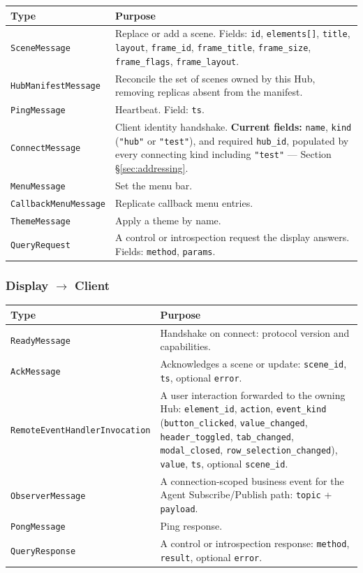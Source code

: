 \documentclass[a4paper,10pt]{article}
\newcommand{\msg}[1]{\texttt{#1}}
\newcommand{\field}[1]{\texttt{#1}}
\begin{document}
\begin{center}
\begin{tabular}{lp{9cm}}
\toprule
\textbf{Type} & \textbf{Purpose} \\
\midrule
\msg{SceneMessage}  & Replace or add a scene.  Fields: \field{id},
  \field{elements[]}, \field{title}, \field{layout}, \field{frame\_id},
  \field{frame\_title}, \field{frame\_size}, \field{frame\_flags},
  \field{frame\_layout}. \\
\msg{HubManifestMessage} & Reconcile the set of scenes owned by this Hub,
  removing replicas absent from the manifest. \\
\msg{PingMessage}   & Heartbeat.  Field: \field{ts}. \\
\msg{ConnectMessage} & Client identity handshake.  \textbf{Current fields:}
  \field{name}, \field{kind} (\texttt{"hub"} or \texttt{"test"}), and required
  \field{hub\_id}, populated by every connecting kind including
  \texttt{"test"} --- Section \S\ref{sec:addressing}. \\
\msg{MenuMessage}   & Set the menu bar. \\
\msg{CallbackMenuMessage} & Replicate callback menu entries. \\
\msg{ThemeMessage}  & Apply a theme by name. \\
\msg{QueryRequest}  & A control or introspection request the display
  answers.  Fields: \field{method}, \field{params}. \\
\bottomrule
\end{tabular}
\end{center}

\subsubsection{Display $\to$ Client}

\begin{center}
\begin{tabular}{lp{9cm}}
\toprule
\textbf{Type} & \textbf{Purpose} \\
\midrule
\msg{ReadyMessage}       & Handshake on connect: protocol version and
  capabilities. \\
\msg{AckMessage}         & Acknowledges a scene or update: \field{scene\_id},
  \field{ts}, optional \field{error}. \\
\msg{RemoteEventHandlerInvocation} & A user interaction forwarded to the
  owning Hub: \field{element\_id}, \field{action}, \field{event\_kind}
  (\texttt{button\_clicked}, \texttt{value\_changed},
  \texttt{header\_toggled}, \texttt{tab\_changed},
  \texttt{modal\_closed}, \texttt{row\_selection\_changed}), \field{value},
  \field{ts}, optional \field{scene\_id}. \\
\msg{ObserverMessage}    & A connection-scoped business event for the Agent
  Subscribe/Publish path: \field{topic} + \field{payload}. \\
\msg{PongMessage}        & Ping response. \\
\msg{QueryResponse}      & A control or introspection response:
  \field{method}, \field{result}, optional \field{error}. \\
\bottomrule
\end{tabular}
\end{center}
\end{document}
